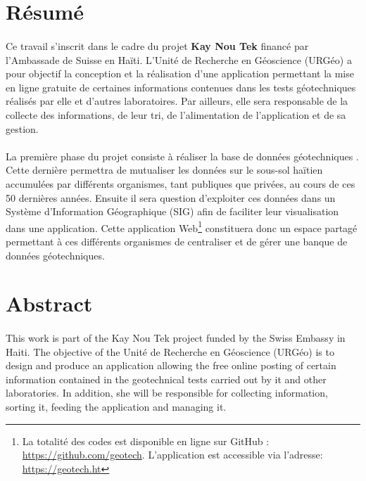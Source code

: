 \section{Résumé}
\paragraph{}
Ce travail s'inscrit dans le cadre du projet \textbf{Kay Nou Tek}
financé par l’Ambassade de Suisse en Haïti. 
L'Unité de Recherche en Géoscience (URGéo) a pour objectif la conception et la réalisation
d’une application permettant la mise en 
ligne gratuite de certaines informations contenues dans les tests 
géotechniques réalisés par elle et d’autres laboratoires.
Par ailleurs, elle sera responsable de la collecte des informations, de leur tri, de l’alimentation 
de l’application et de sa gestion. 
\paragraph{}
La première phase du projet consiste à réaliser la base de données géotechniques
. Cette dernière permettra de mutualiser les données 
 sur le sous-sol haïtien accumulées par différents organismes, tant publiques que privées, 
 au cours de ces 50 dernières années. Ensuite il sera question d'exploiter ces 
 données dans un Système d'Information Géographique (SIG)  afin de faciliter leur visualisation dans une application.
  Cette application 
 Web\footnote{ 
    La totalité des codes est disponible en ligne sur GitHub : 
    \url{https://github.com/geotech}.
    L’application est accessible via l’adresse: 
    \url{https://geotech.ht}
    }
 constituera donc un espace 
 partagé permettant à ces différents organismes de centraliser et de gérer une banque 
 de données géotechniques.


\newpage
\section{Abstract}
\paragraph{}
This work is part of the Kay Nou Tek project funded by the Swiss 
Embassy in Haiti. The objective of the Unité de Recherche en Géoscience (URGéo) 
is to design and produce an application allowing the free online posting 
of certain information contained in the geotechnical tests carried out by 
it and other laboratories. In addition, she will be responsible for collecting 
information, sorting it, feeding the application and managing it.
